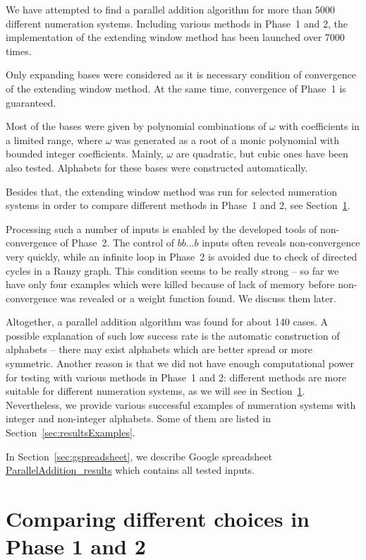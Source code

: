 We have attempted to find a parallel addition algorithm for more than 5000 different numeration systems. Including various methods in Phase~1 and 2, the implementation of the extending window method has been launched over 7000 times. 

Only expanding bases were considered as it is  necessary condition of convergence of the extending window method. At the same time, convergence of Phase~1 is guaranteed.

Most of the bases were given by polynomial combinations of $\omega$ with coefficients in a limited range, where $\omega$ was generated as a root of a monic polynomial with bounded integer coefficients. Mainly, $\omega$ are  quadratic, but cubic ones have been also tested. Alphabets for these bases were constructed automatically. 

Besides that, the extending window method was run for selected numeration systems in order to compare different methods in Phase~1 and 2, see  Section~\ref{sec:compareMethods}.

Processing such a number of inputs is enabled by the developed tools of non-convergence of Phase~2. The control of $bb\dots b$ inputs often reveals non-convergence very quickly, while an infinite loop in Phase~2 is avoided due to check of directed cycles in a Rauzy graph. This condition seems to be really strong -- so far we have only four examples which were killed because of lack of memory before non-convergence was revealed or a weight function found. We discuss them later.

Altogether, a parallel addition algorithm was found for about 140 cases. A possible explanation of such low success rate is the automatic construction of alphabets -- there may exist  alphabets which are better spread or more symmetric. Another reason is that we did not have enough computational power for testing with various methods in Phase~1 and 2:  different methods are more suitable for different numeration systems, as we will see in Section~\ref{sec:compareMethods}.
Nevertheless, we provide various successful examples of numeration systems with integer and non-integer alphabets. Some of them are listed in Section~\ref{sec:resultsExamples}.

In Section~\ref{sec:gspreadsheet}, we describe Google spreadsheet \href{https://docs.google.com/spreadsheets/d/1TnhrHdefHfHa0WSeVs4q6XVj3epjPlPlnoekE0E1xeM/edit?usp=sharing}{ParallelAddition\_results} which contains all tested inputs.

\section{Comparing different choices in Phase 1 and 2}
\label{sec:compareMethods}

